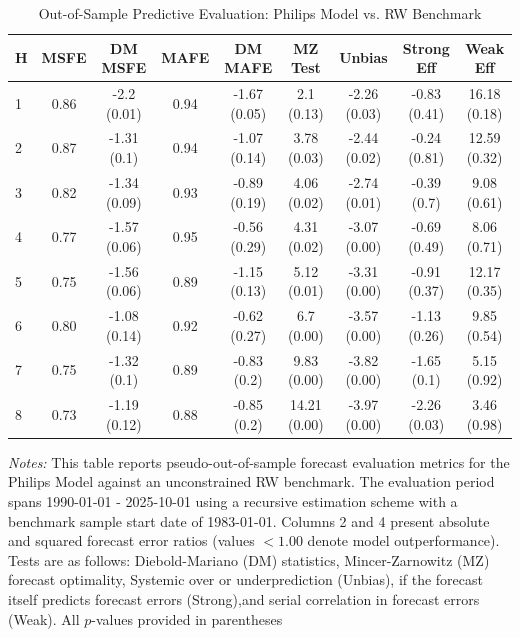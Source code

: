 \begin{table}[htbp]
\centering
\caption{Out-of-Sample Predictive Evaluation: Philips Model vs. RW Benchmark}
\label{tab:philips_model_evaluation}
\footnotesize
\begin{tabular}{l cccccccc}
\hline\hline
\rule{0pt}{3ex}
\textbf{H} & \textbf{MSFE} & \textbf{DM MSFE} & \textbf{MAFE} & \textbf{DM MAFE} & \textbf{MZ Test} & \textbf{Unbias} & \textbf{Strong Eff} & \textbf{Weak Eff} \\[0.5ex]
\hline
\rule{0pt}{2.5ex}
1 & 0.86 & -2.2 (0.01) & 0.94 & -1.67 (0.05) & 2.1 (0.13) & -2.26 (0.03) & -0.83 (0.41) & 16.18 (0.18) \\
2 & 0.87 & -1.31 (0.1) & 0.94 & -1.07 (0.14) & 3.78 (0.03) & -2.44 (0.02) & -0.24 (0.81) & 12.59 (0.32) \\
3 & 0.82 & -1.34 (0.09) & 0.93 & -0.89 (0.19) & 4.06 (0.02) & -2.74 (0.01) & -0.39 (0.7) & 9.08 (0.61) \\
4 & 0.77 & -1.57 (0.06) & 0.95 & -0.56 (0.29) & 4.31 (0.02) & -3.07 (0.00) & -0.69 (0.49) & 8.06 (0.71) \\
5 & 0.75 & -1.56 (0.06) & 0.89 & -1.15 (0.13) & 5.12 (0.01) & -3.31 (0.00) & -0.91 (0.37) & 12.17 (0.35) \\
6 & 0.80 & -1.08 (0.14) & 0.92 & -0.62 (0.27) & 6.7 (0.00) & -3.57 (0.00) & -1.13 (0.26) & 9.85 (0.54) \\
7 & 0.75 & -1.32 (0.1) & 0.89 & -0.83 (0.2) & 9.83 (0.00) & -3.82 (0.00) & -1.65 (0.1) & 5.15 (0.92) \\
8 & 0.73 & -1.19 (0.12) & 0.88 & -0.85 (0.2) & 14.21 (0.00) & -3.97 (0.00) & -2.26 (0.03) & 3.46 (0.98) \\
\hline\hline
\end{tabular}%
\par\smallskip
\parbox{\textwidth}{\scriptsize \textit{Notes:} This table reports pseudo-out-of-sample forecast evaluation metrics for the Philips Model against an unconstrained RW benchmark. The evaluation period spans 1990-01-01 - 2025-10-01 using a recursive estimation scheme with a benchmark sample start date of 1983-01-01. Columns 2 and 4 present absolute and squared forecast error ratios (values $< 1.00$ denote model outperformance). Tests are as follows: Diebold-Mariano (DM) statistics, Mincer-Zarnowitz (MZ) forecast optimality, Systemic over or underprediction (Unbias), if the forecast itself predicts forecast errors (Strong),and serial correlation in forecast errors (Weak). All $p$-values provided in parentheses}
\end{table}
